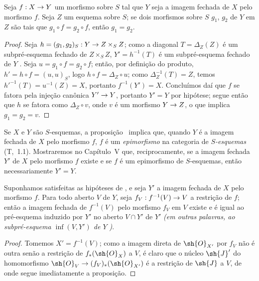 \documentclass[oneside]{amsart}
\makeatletter
\newcommand{\ega@arrow}[2]{\mathchoice{#1}{#2}{#2}{#2}}
\renewcommand{\to}{\ega@arrow{\longrightarrow}{\rightarrow}}
\newcommand{\oldpage}[2][]{{\marginnote{\normalfont\textbf{#1}~|~#2}}\ignorespaces}
\let\EGAOriginalLabel\label
\renewcommand{\label}[1]{\phantomsection\EGAOriginalLabel{#1}}
\makeatother
\begin{document}
\begin{corollary}[9.5.6]
\label{I.9.5.6}
Seja $f:X\to Y$ um morfismo sobre $S$ tal que $Y$ seja a imagem fechada de $X$ pelo morfismo $f$.
Seja $Z$ um esquema sobre $S$; se dois morfismos sobre $S$ $g_1$, $g_2$ de $Y$ em $Z$
são tais que $g_1\circ f=g_2\circ f$, então $g_1=g_2$.
\end{corollary}

\begin{proof}
Seja $h=(g_1,g_2)_S:Y\to Z\times_S Z$; como a diagonal $T=\Delta_Z(Z)$ é um
subpré-esquema fechado de $Z\times_S Z$, $Y'=h^{-1}(T)$ é um subpré-esquema fechado de $Y$
. Seja $u=g_1\circ f=g_2\circ f$; então, por definição do produto,
$h'=h\circ f=(u,u)_S$, logo $h\circ f=\Delta_Z\circ u$; como
$\Delta_Z^{-1}(T)=Z$, temos $h'^{-1}(T)=u^{-1}(Z)=X$, portanto $f^{-1}(Y')=X$.
Concluímos daí  que $f$ se fatora pela injeção canônica $Y'\to Y$,
portanto $Y'=Y$ por hipótese; segue então  que $h$ se fatora como
$\Delta_Z\circ v$, onde $v$ é um morfismo $Y\to Z$, o que implica $g_1=g_2=v$.
\end{proof}

\begin{remark}[9.5.7]
\label{I.9.5.7}
Se $X$ e $Y$ são $S$-esquemas, a proposição~ implica que,
\oldpage[I]{178}
quando $Y$ é a imagem fechada de $X$ pelo morfismo $f$, $f$ é um \emph{epimorfismo} na categoria de \emph{$S$-esquemas} (T,~1.1). Mostraremos no Capítulo~V que, reciprocamente, se a imagem fechada $Y'$ de $X$ pelo morfismo $f$ existe e se $f$ é um epimorfismo de $S$-esquemas, então necessariamente $Y'=Y$.
\end{remark}

\begin{proposition}[9.5.8]
\label{I.9.5.8}
Suponhamos satisfeitas as hipóteses de , e seja $Y'$ a imagem fechada de $X$ pelo morfismo $f$. Para todo aberto $V$ de $Y$, seja
$f_V:f^{-1}(V)\to V$ a restrição de $f$; então a imagem fechada de
$f^{-1}(V)$ pelo morfismo $f_V$ em $V$ existe e é igual ao pré-esquema induzido por
$Y'$ no aberto $V\cap Y'$ de $Y'$ \emph{(em outras palavras, ao subpré-esquema
$\inf(V,Y')$ de $Y$ )}.
\end{proposition}

\begin{proof}
Tomemos $X'=f^{-1}(V)$; como a imagem direta de $\sh{O}_{X'}$ por
$f_V$ não é outra senão a restrição de $f_*(\sh{O}_X)$ a $V$, é claro
que o núcleo $\sh{J}'$ do homomorfismo
$\sh{O}_V\to(f_V)_*(\sh{O}_{X'})$ é a restrição de
$\sh{J}$ a $V$, de onde segue imediatamente a proposição.
\end{proof}
\end{document}
